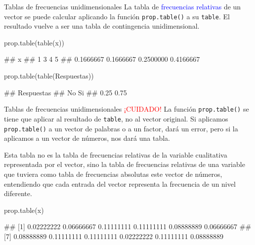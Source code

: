 \documentclass[
  ignorenonframetext,
  aspectratio=169]{beamer}
\newenvironment{Shaded}{\begin{snugshade}}{\end{snugshade}}
\newcommand{\FunctionTok}[1]{\textcolor[rgb]{0.00,0.00,0.00}{#1}}
\newcommand{\NormalTok}[1]{#1}
\let\oldverbatim\verbatim
\let\endoldverbatim\endverbatim
\renewenvironment{verbatim}{\tiny\oldverbatim}{\endoldverbatim}
\newcommand\blue[1]{\textcolor{blue}{#1}}
\newcommand\red[1]{\textcolor{red}{#1}}
\begin{document}
\begin{frame}[fragile]{Tablas de frecuencias unidimensionales}
\protect\hypertarget{tablas-de-frecuencias-unidimensionales-8}{}
La tabla de \blue{frecuencias relativas} de un vector se puede calcular
aplicando la función \texttt{prop.table()} a su \texttt{table}. El
resultado vuelve a ser una tabla de contingencia unidimensional.

\begin{Shaded}
\begin{Highlighting}[]
\FunctionTok{prop.table}\NormalTok{(}\FunctionTok{table}\NormalTok{(x))}
\end{Highlighting}
\end{Shaded}

\begin{verbatim}
## x
##         1         3         4         5 
## 0.1666667 0.1666667 0.2500000 0.4166667
\end{verbatim}

\begin{Shaded}
\begin{Highlighting}[]
\FunctionTok{prop.table}\NormalTok{(}\FunctionTok{table}\NormalTok{(Respuestas))}
\end{Highlighting}
\end{Shaded}

\begin{verbatim}
## Respuestas
##   No   Si 
## 0.25 0.75
\end{verbatim}
\end{frame}

\begin{frame}[fragile]{Tablas de frecuencias unidimensionales}
\protect\hypertarget{tablas-de-frecuencias-unidimensionales-9}{}
\red{¡CUIDADO!} La función \texttt{prop.table()} se tiene que aplicar al
resultado de \texttt{table}, no al vector original. Si aplicamos
\texttt{prop.table()} a un vector de palabras o a un factor, dará un
error, pero si la aplicamos a un vector de números, nos dará una tabla.

Esta tabla no es la tabla de frecuencias relativas de la variable
cualitativa representada por el vector, sino la tabla de frecuencias
relativas de una variable que tuviera como tabla de frecuencias
absolutas este vector de números, entendiendo que cada entrada del
vector representa la frecuencia de un nivel diferente.

\begin{Shaded}
\begin{Highlighting}[]
\FunctionTok{prop.table}\NormalTok{(x)}
\end{Highlighting}
\end{Shaded}

\begin{verbatim}
##  [1] 0.02222222 0.06666667 0.11111111 0.11111111 0.08888889 0.06666667
##  [7] 0.08888889 0.11111111 0.11111111 0.02222222 0.11111111 0.08888889
\end{verbatim}
\end{frame}
\end{document}
